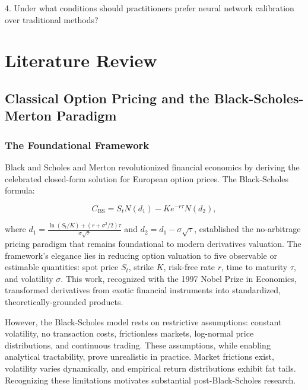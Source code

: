 \documentclass[12pt,a4paper]{article}
\begin{document}
4. Under what conditions should practitioners prefer neural network calibration over traditional methods?





\newpage

\section{Literature Review}

\label{sec:literature}

\subsection{Classical Option Pricing and the Black-Scholes-Merton Paradigm}

\subsubsection{The Foundational Framework}

Black and Scholes \cite{BlackScholes1973} and Merton \cite{Merton1973} revolutionized financial economics by deriving the celebrated closed-form solution for European option prices. The Black-Scholes formula:

\begin{equation}
C_{\text{BS}} = S_t N(d_1) - K e^{-r\tau} N(d_2),
\end{equation}

where $d_1 = \frac{\ln(S_t/K) + (r + \sigma^2/2)\tau}{\sigma\sqrt{\tau}}$ and $d_2 = d_1 - \sigma\sqrt{\tau}$, established the no-arbitrage pricing paradigm that remains foundational to modern derivatives valuation. The framework's elegance lies in reducing option valuation to five observable or estimable quantities: spot price $S_t$, strike $K$, risk-free rate $r$, time to maturity $\tau$, and volatility $\sigma$. This work, recognized with the 1997 Nobel Prize in Economics, transformed derivatives from exotic financial instruments into standardized, theoretically-grounded products.

However, the Black-Scholes model rests on restrictive assumptions: constant volatility, no transaction costs, frictionless markets, log-normal price distributions, and continuous trading. These assumptions, while enabling analytical tractability, prove unrealistic in practice. Market frictions exist, volatility varies dynamically, and empirical return distributions exhibit fat tails. Recognizing these limitations motivates substantial post-Black-Scholes research.
\end{document}
